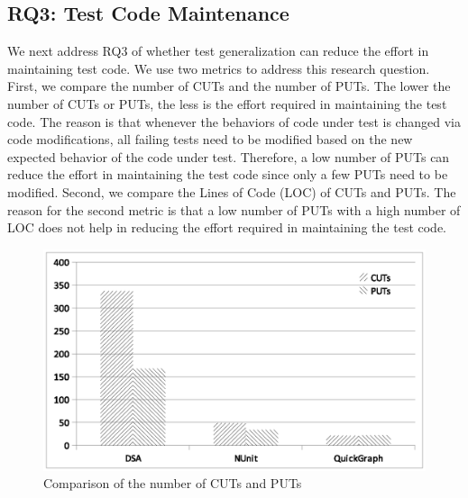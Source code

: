 \subsection{RQ3: Test Code Maintenance}

We next address RQ3 of whether test generalization can reduce the effort in maintaining test code. We use two metrics to address this research question. First, we compare the number of CUTs and the number of PUTs. The lower the number of CUTs or PUTs, the less is the effort required in maintaining the test code. The reason is that whenever the behaviors of code under test is changed via code modifications, all failing tests need to be modified based on the new expected behavior of the code under test. Therefore, a low number of PUTs can reduce the effort in maintaining the test code since only a few PUTs need to be modified. Second, we compare the Lines of Code (LOC) of CUTs and PUTs. The reason for the second metric is that a low number of PUTs with a high number of LOC does not help in reducing the effort required in maintaining the test code.

\begin{figure}[t]
\centering
\includegraphics[scale=0.60,clip,trim=200 200 00 150]{charts/CUTs_PUTs_1.eps}\vspace*{-4ex}
\caption{\label{fig:cutsnputs}Comparison of the number of CUTs and PUTs} \vspace*{-4ex}
\end{figure}

